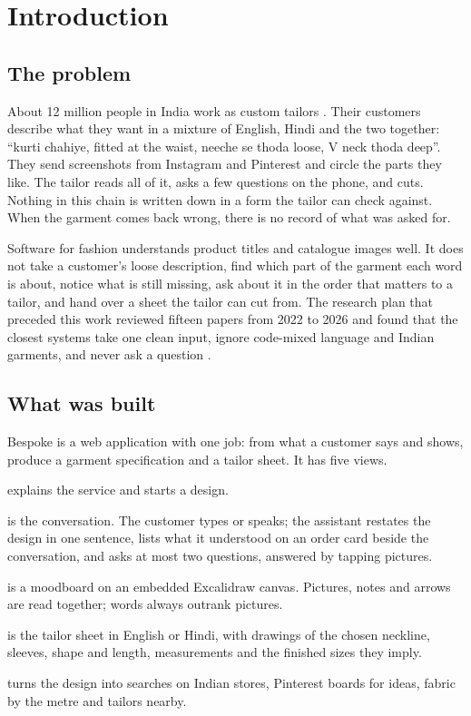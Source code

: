 \chapter{Introduction}

\section{The problem}
About 12 million people in India work as custom tailors \cite{dataforindia}. Their customers describe what they want in a mixture of English, Hindi and the two together: ``kurti chahiye, fitted at the waist, neeche se thoda loose, V neck thoda deep''. They send screenshots from Instagram and Pinterest and circle the parts they like. The tailor reads all of it, asks a few questions on the phone, and cuts. Nothing in this chain is written down in a form the tailor can check against. When the garment comes back wrong, there is no record of what was asked for.

Software for fashion understands product titles and catalogue images well. It does not take a customer's loose description, find which part of the garment each word is about, notice what is still missing, ask about it in the order that matters to a tailor, and hand over a sheet the tailor can cut from. The research plan that preceded this work reviewed fifteen papers from 2022 to 2026 and found that the closest systems take one clean input, ignore code-mixed language and Indian garments, and never ask a question \cite{bian2025chatgarment,cheng2026chatpref}.

\section{What was built}
Bespoke is a web application with one job: from what a customer says and shows, produce a garment specification and a tailor sheet. It has five views.

\begin{description}[leftmargin=0pt,labelsep=0.6em,itemsep=4pt,font=\normalfont\scshape]
\item[Home] explains the service and starts a design.
\item[Talk] is the conversation. The customer types or speaks; the assistant restates the design in one sentence, lists what it understood on an order card beside the conversation, and asks at most two questions, answered by tapping pictures.
\item[Board] is a moodboard on an embedded Excalidraw canvas. Pictures, notes and arrows are read together; words always outrank pictures.
\item[Sheet] is the tailor sheet in English or Hindi, with drawings of the chosen neckline, sleeves, shape and length, measurements and the finished sizes they imply.
\item[Shop] turns the design into searches on Indian stores, Pinterest boards for ideas, fabric by the metre and tailors nearby.
\end{description}

